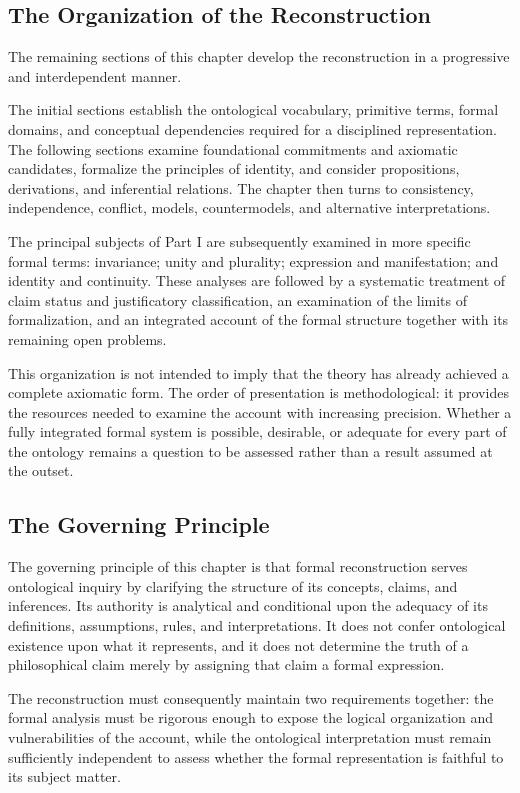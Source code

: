 \subsection{The Organization of the Reconstruction}

The remaining sections of this chapter develop the reconstruction in a
progressive and interdependent manner.

The initial sections establish the ontological vocabulary, primitive
terms, formal domains, and conceptual dependencies required for a
disciplined representation. The following sections examine foundational
commitments and axiomatic candidates, formalize the principles of identity,
and consider propositions, derivations, and inferential relations. The
chapter then turns to consistency, independence, conflict, models,
countermodels, and alternative interpretations.

The principal subjects of Part I are subsequently examined in more
specific formal terms: invariance; unity and plurality; expression and
manifestation; and identity and continuity. These analyses are followed
by a systematic treatment of claim status and justificatory classification,
an examination of the limits of formalization, and an integrated account
of the formal structure together with its remaining open problems.

This organization is not intended to imply that the theory has already
achieved a complete axiomatic form. The order of presentation is
methodological: it provides the resources needed to examine the account
with increasing precision. Whether a fully integrated formal system is
possible, desirable, or adequate for every part of the ontology remains a
question to be assessed rather than a result assumed at the outset.

\subsection{The Governing Principle}

The governing principle of this chapter is that formal reconstruction
serves ontological inquiry by clarifying the structure of its concepts,
claims, and inferences. Its authority is analytical and conditional upon
the adequacy of its definitions, assumptions, rules, and interpretations.
It does not confer ontological existence upon what it represents, and it
does not determine the truth of a philosophical claim merely by assigning
that claim a formal expression.

The reconstruction must consequently maintain two requirements together:
the formal analysis must be rigorous enough to expose the logical
organization and vulnerabilities of the account, while the ontological
interpretation must remain sufficiently independent to assess whether the
formal representation is faithful to its subject matter.

